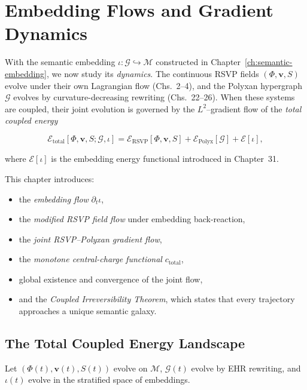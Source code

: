 \chapter{Embedding Flows and Gradient Dynamics}
\label{ch:embedding-flows}

With the semantic embedding
$\iota : \mathcal{G} \hookrightarrow \mathcal{M}$
constructed in Chapter~\ref{ch:semantic-embedding}, we now study its
\emph{dynamics}.  
The continuous RSVP fields $(\Phi,\mathbf{v},S)$ evolve under their own
Lagrangian flow (Chs.~2–4), and the Polyxan hypergraph $\mathcal{G}$
evolves by curvature-decreasing rewriting (Chs.~22–26).  
When these systems are coupled, their joint evolution is governed by the
$L^2$–gradient flow of the \emph{total coupled energy}

\begin{equation}
\label{eq:E-total}
\mathcal{E}_{\mathrm{total}}[\Phi,\mathbf{v},S;\mathcal{G},\iota]
  = \mathcal{E}_{\mathrm{RSVP}}[\Phi,\mathbf{v},S]
  + \mathcal{E}_{\mathrm{Polyx}}[\mathcal{G}]
  + \mathcal{E}[\iota],
\end{equation}

where $\mathcal{E}[\iota]$ is the embedding energy functional introduced
in Chapter~31.

This chapter introduces:
\begin{itemize}
\item the \emph{embedding flow} $\partial_t\iota$,  
\item the \emph{modified RSVP field flow} under embedding back-reaction,  
\item the \emph{joint RSVP–Polyxan gradient flow},  
\item the \emph{monotone central-charge functional} $c_{\mathrm{total}}$,  
\item global existence and convergence of the joint flow,  
\item and the \emph{Coupled Irreversibility Theorem}, which states that
every trajectory approaches a unique semantic galaxy.
\end{itemize}

\section{The Total Coupled Energy Landscape}

Let
$(\Phi(t),\mathbf{v}(t),S(t))$ evolve on $\mathcal{M}$,
$\mathcal{G}(t)$ evolve by EHR rewriting,
and $\iota(t)$ evolve in the stratified space of embeddings.


